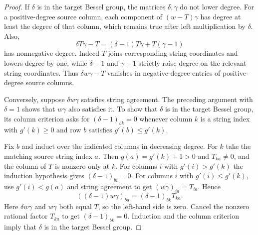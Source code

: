 \begin{proof}
If $\delta$ is in the target Bessel group, the matrices $\delta,\gamma$ do not lower degree. For a positive-degree source column, each component of $(w-T)\gamma$ has degree at least the degree of that column, which remains true after left multiplication by $\delta$. Also,
\[
 \delta T\gamma-T=(\delta-1)T\gamma+T(\gamma-1)
\]
has nonnegative degree. Indeed $T$ joins corresponding string coordinates and lowers degree by one, while $\delta-1$ and $\gamma-1$ strictly raise degree on the relevant string coordinates. Thus $\delta w\gamma-T$ vanishes in negative-degree entries of positive-degree source columns.

Conversely, suppose $\delta w\gamma$ satisfies string agreement. The preceding argument with $\delta=1$ shows that $w\gamma$ also satisfies it. To show that $\delta$ is in the target Bessel group, its column criterion asks for $(\delta-1)_{bk}=0$ whenever column $k$ is a string index with $g'(k)\ge0$ and row $b$ satisfies $g'(b)\le g'(k)$.

Fix $b$ and induct over the indicated columns in decreasing degree. For $k$ take the matching source string index $a$. Then $g(a)=g'(k)+1>0$ and $T_{ka}\ne0$, and the column of $T$ is nonzero only at $k$. For columns $i$ with $g'(i)>g'(k)$ the induction hypothesis gives $(\delta-1)_{bi}=0$. For columns $i$ with $g'(i)\le g'(k)$, use $g'(i)<g(a)$ and string agreement to get $(w\gamma)_{ia}=T_{ia}$. Hence
\[
 ((\delta-1)w\gamma)_{ba}=(\delta-1)_{bk}T_{ka}.
\]
Here $\delta w\gamma$ and $w\gamma$ both equal $T$, so the left-hand side is zero. Cancel the nonzero rational factor $T_{ka}$ to get $(\delta-1)_{bk}=0$. Induction and the column criterion imply that $\delta$ is in the target Bessel group.
\end{proof}

